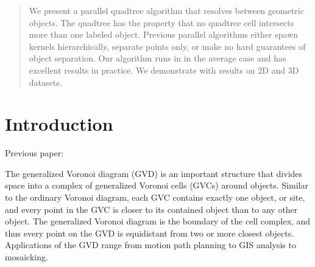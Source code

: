 \documentclass{egpubl}
\begin{document}
\begin{abstract}
We present a parallel quadtree algorithm that resolves between geometric objects. The quadtree has the property that no quadtree cell intersects more than one labeled object. Previous parallel algorithms either spawn kernels hierarchically, separate points only, or make no hard guarantees of object separation. Our algorithm runs in  in the average case and has excellent results in practice. We demonstrate with results on 2D and 3D datasets.


\begin{classification} %
\end{classification}

\end{abstract}


\section{Introduction}
\label{sec:intro}
Previous paper: \cite{edwards2015approximating}

The generalized Voronoi diagram (GVD) is an important structure that divides space into a complex of generalized Voronoi cells (GVCs) around objects.  Similar to the ordinary Voronoi diagram, each GVC contains exactly one object, or site, and every point in the GVC is closer to its contained object than to any other object.  The generalized Voronoi diagram is the boundary of the cell complex, and thus every point on the GVD is equidistant from two or more closest objects.  Applications of the GVD range from motion path planning to GIS analysis to mosaicking.
\end{document}
